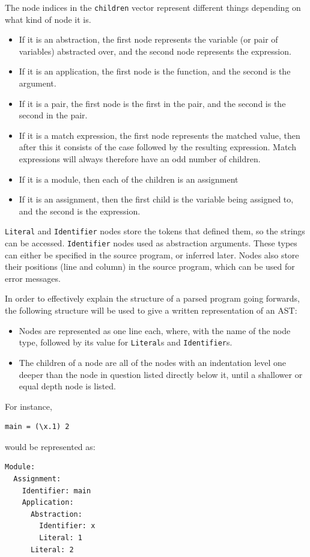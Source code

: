 The node indices in the \verb|children| vector represent different things depending on what kind of node it is. 
\begin{itemize}
    \item If it is an abstraction, the first node represents the variable (or pair of variables) abstracted over, and the second node represents the expression.
    \item If it is an application, the first node is the function, and the second is the argument.
    \item If it is a pair, the first node is the first in the pair, and the second is the second in the pair.
    \item If it is a match expression, the first node represents the matched value, then after this it consists of the case followed by the resulting expression. Match expressions will always therefore have an odd number of children.
    \item If it is a module, then each of the children is an assignment
    \item If it is an assignment, then the first child is the variable being assigned to, and the second is the expression.
\end{itemize}

\verb|Literal| and \verb|Identifier| nodes store the tokens that defined them, so the strings can be accessed. \verb|Identifier| nodes used as abstraction arguments. These types can either be specified in the source program, or inferred later. Nodes also store their positions (line and column) in the source program, which can be used for error messages. 

In order to effectively explain the structure of a parsed program going forwards, the following structure will be used to give a written representation of an AST:
\begin{itemize}
    \item Nodes are represented as one line each, where, with the name of the node type, followed by its value for \verb|Literal|s and \verb|Identifier|s.
    \item The children of a node are all of the nodes with an indentation level one deeper than the node in question listed directly below it, until a shallower or equal depth node is listed. 
\end{itemize}

\noindent
For instance, 
\begin{lstlisting}
main = (\x.1) 2
\end{lstlisting}
would be represented as:
\begin{lstlisting}
Module:
  Assignment:
    Identifier: main
    Application:
      Abstraction:
        Identifier: x
        Literal: 1
      Literal: 2
\end{lstlisting}

